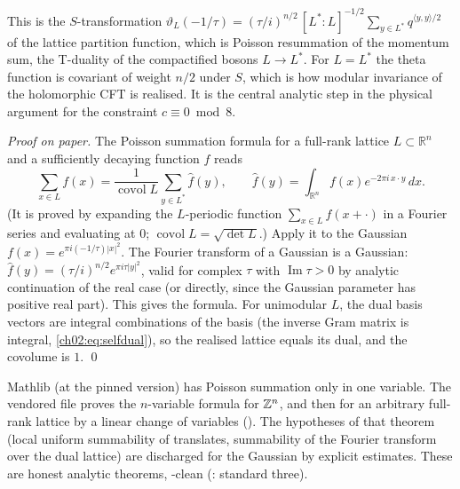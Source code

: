 \begin{physics}
This is the $S$-transformation $\vartheta_L(-1/\tau)=(\tau/i)^{n/2}\,[L^*:L]^{-1/2}\sum_{y\in L^*}q^{\langle y,y\rangle/2}$ of the lattice partition function, which is Poisson resummation of the momentum sum, the T-duality of the compactified bosons $L\to L^*$. For $L=L^*$ the theta function is covariant of weight $n/2$ under $S$, which is how modular invariance of the holomorphic CFT is realised. It is the central analytic step in the physical argument for the constraint $c\equiv0\bmod8$.
\end{physics}
\emph{Proof on paper.}  The Poisson summation formula for a full-rank lattice $L\subset\mathbb{R}^n$
and a sufficiently decaying function $f$ reads
\begin{equation*}
\sum_{x\in L}f(x)=\frac1{\operatorname{covol}L}\sum_{y\in L^*}\hat f(y),\qquad
\hat f(y)=\int_{\mathbb{R}^n}f(x)e^{-2\pi i\,x\cdot y}\,dx .
\end{equation*}
(It is proved by expanding the $L$-periodic function $\sum_{x\in L}f(x+\cdot)$ in a Fourier series
and evaluating at $0$; $\operatorname{covol}L=\sqrt{\det L}$.)  Apply it to the Gaussian
$f(x)=e^{\pi i(-1/\tau)|x|^2}$.  The Fourier transform of a Gaussian is a Gaussian:
$\hat f(y)=(\tau/i)^{n/2}e^{\pi i\tau|y|^2}$, valid for complex $\tau$ with
$\operatorname{Im}\tau>0$ by analytic continuation of the real case (or directly, since the
Gaussian parameter has positive real part).  This gives the formula.  For unimodular $L$, the
dual basis vectors are integral combinations of the basis (the inverse Gram matrix is integral,
\eqref{ch02:eq:selfdual}), so the realised lattice equals its dual, and the covolume is $1$. \qed

\begin{warning}[title={What had to be built: multivariable Poisson summation}]
Mathlib (at the pinned version) has Poisson summation only in one variable.  The vendored file
 proves the $n$-variable formula for ${\mathbb{Z}}^n$, and then
for an arbitrary full-rank lattice by a linear change of variables ().
The hypotheses of that theorem (local uniform summability of translates, summability of the
Fourier transform over the dual lattice) are discharged for the Gaussian by explicit
estimates.  These are honest analytic theorems, -clean
(: standard three).
\end{warning}

